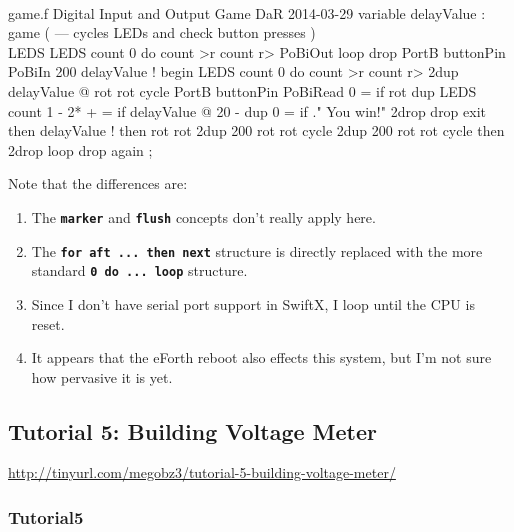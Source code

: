 \documentclass[10pt,english]{article}
\begin{document}
\nwenddocs{}\endmoddef
\\ game.f Digital Input and Output Game      DaR 2014-03-29
variable delayValue
: game ( --- cycles LEDs and check button presses )   \\LEDS
   LEDS count 0 do  count >r count r> PoBiOut  loop  drop
   PortB buttonPin PoBiIn  200 delayValue !
   begin  LEDS count 0 do  count >r count r>
         2dup delayValue @ rot rot cycle
         PortB buttonPin PoBiRead 0 = if
            rot dup LEDS count 1 - 2* + = if
               delayValue @ 20 - dup 0 = if
                  ." You win!" 2drop drop exit
               then  delayValue !
            then  rot rot
            2dup 200 rot rot cycle
            2dup 200 rot rot cycle
         then  2drop
      loop  drop
   again ;
\nwendcode{}\nwdocspar

Note that the differences are:
\begin{enumerate}
\item The \texttt{\textbf{marker}} and \texttt{\textbf{flush}} concepts
don't really apply here.
\item The \texttt{\textbf{for aft ... then next}} structure is directly
replaced with the more standard \texttt{\textbf{0 do ... loop}} structure.
\item Since I don't have serial port support in SwiftX, I loop until the
CPU is reset.
\item It appears that the eForth reboot also effects this system, but I'm
not sure how pervasive it is yet.
\end{enumerate}

\subsection{Tutorial 5: Building Voltage Meter}

\url{http://tinyurl.com/megobz3/tutorial-5-building-voltage-meter/}


\subsubsection{Tutorial5}
\end{document}
